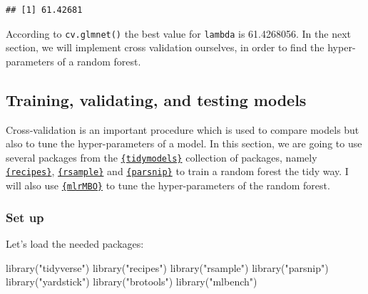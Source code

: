 \documentclass[
]{article}
\newenvironment{Shaded}{\begin{snugshade}}{\end{snugshade}}
\newcommand{\CommentTok}[1]{\textcolor[rgb]{0.56,0.35,0.01}{\textit{#1}}}
\newcommand{\FunctionTok}[1]{\textcolor[rgb]{0.00,0.00,0.00}{#1}}
\newcommand{\NormalTok}[1]{#1}
\newcommand{\OtherTok}[1]{\textcolor[rgb]{0.56,0.35,0.01}{#1}}
\newcommand{\SpecialCharTok}[1]{\textcolor[rgb]{0.00,0.00,0.00}{#1}}
\newcommand{\StringTok}[1]{\textcolor[rgb]{0.31,0.60,0.02}{#1}}
\begin{document}
\begin{Shaded}
\end{Shaded}

\begin{verbatim}
## [1] 61.42681
\end{verbatim}

According to \texttt{cv.glmnet()} the best value for \texttt{lambda} is 61.4268056. In the
next section, we will implement cross validation ourselves, in order to find the hyper-parameters
of a random forest.

\hypertarget{training-validating-and-testing-models}{%
\subsection{Training, validating, and testing models}\label{training-validating-and-testing-models}}

Cross-validation is an important procedure which is used to compare models but also to tune the
hyper-parameters of a model. In this section, we are going to use several packages from the
\href{https://github.com/tidymodels}{\texttt{\{tidymodels\}}} collection of packages, namely
\href{https://tidymodels.github.io/recipes/}{\texttt{\{recipes\}}},
\href{https://tidymodels.github.io/rsample/}{\texttt{\{rsample\}}} and
\href{https://tidymodels.github.io/parsnip/}{\texttt{\{parsnip\}}} to train a random forest the tidy way. I will
also use \href{http://mlrmbo.mlr-org.com/}{\texttt{\{mlrMBO\}}} to tune the hyper-parameters of the random forest.

\hypertarget{set-up}{%
\subsubsection{Set up}\label{set-up}}

Let's load the needed packages:

\begin{Shaded}
\begin{Highlighting}[]
\FunctionTok{library}\NormalTok{(}\StringTok{"tidyverse"}\NormalTok{)}
\FunctionTok{library}\NormalTok{(}\StringTok{"recipes"}\NormalTok{)}
\FunctionTok{library}\NormalTok{(}\StringTok{"rsample"}\NormalTok{)}
\FunctionTok{library}\NormalTok{(}\StringTok{"parsnip"}\NormalTok{)}
\FunctionTok{library}\NormalTok{(}\StringTok{"yardstick"}\NormalTok{)}
\FunctionTok{library}\NormalTok{(}\StringTok{"brotools"}\NormalTok{)}
\FunctionTok{library}\NormalTok{(}\StringTok{"mlbench"}\NormalTok{)}
\end{Highlighting}
\end{Shaded}
\end{document}
